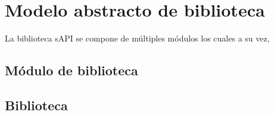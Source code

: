 \section{Modelo abstracto de biblioteca}
\label{sec:modelLibrary}

La biblioteca sAPI se compone de múltiples módulos los cuales a su vez, 

\subsection{Módulo de biblioteca}

\subsection{Biblioteca}
